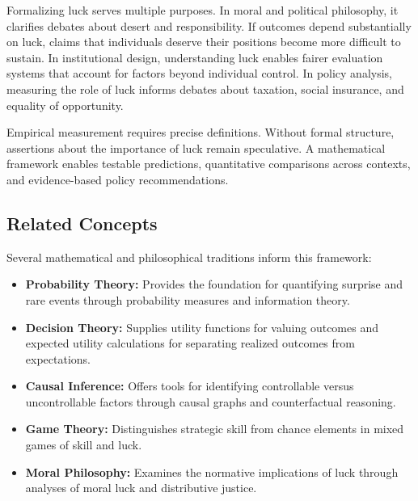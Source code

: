 Formalizing luck serves multiple purposes. In moral and political
philosophy, it clarifies debates about desert and responsibility. If
outcomes depend substantially on luck, claims that individuals deserve their
positions become more difficult to sustain. In institutional design, understanding
luck enables fairer evaluation systems that account for factors beyond individual
control. In policy analysis, measuring the role of luck informs debates about
taxation, social insurance, and equality of opportunity.

Empirical measurement requires precise definitions. Without formal
structure, assertions about the importance of luck remain speculative. A
mathematical framework enables testable predictions, quantitative comparisons
across contexts, and evidence-based policy recommendations.

\subsection{Related Concepts}

Several mathematical and philosophical traditions inform this framework:

\begin{itemize}
  \item \textbf{Probability Theory:} Provides the foundation for
    quantifying surprise and rare events through probability measures
    and information theory.

  \item \textbf{Decision Theory:} Supplies utility functions for valuing
    outcomes and expected utility calculations for separating realized
    outcomes from expectations.

  \item \textbf{Causal Inference:} Offers tools for identifying
    controllable versus uncontrollable factors through causal graphs and
    counterfactual reasoning.

  \item \textbf{Game Theory:} Distinguishes strategic skill from chance
    elements in mixed games of skill and luck.

  \item \textbf{Moral Philosophy:} Examines the normative implications
    of luck through analyses of moral luck and distributive justice.
\end{itemize}